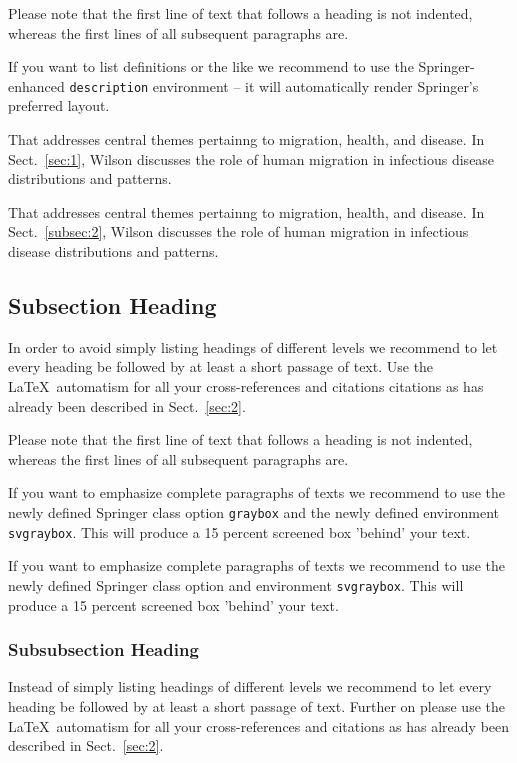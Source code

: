 \documentclass[graybox]{svmult}
\begin{document}
Please note that the first line of text that follows a heading is not indented, whereas the first lines of all subsequent paragraphs are.

If you want to list definitions or the like we recommend to use the Springer-enhanced \verb|description| environment -- it will automatically render Springer's preferred layout.

\begin{description}[Type 1]
\item[Type 1]{That addresses central themes pertainng to migration, health, and disease. In Sect.~\ref{sec:1}, Wilson discusses the role of human migration in infectious disease distributions and patterns.}
\item[Type 2]{That addresses central themes pertainng to migration, health, and disease. In Sect.~\ref{subsec:2}, Wilson discusses the role of human migration in infectious disease distributions and patterns.}
\end{description}

\subsection{Subsection Heading} %
In order to avoid simply listing headings of different levels we recommend to let every heading be followed by at least a short passage of text. Use the \LaTeX\ automatism for all your cross-references and citations citations as has already been described in Sect.~\ref{sec:2}.

Please note that the first line of text that follows a heading is not indented, whereas the first lines of all subsequent paragraphs are.

\begin{svgraybox}
If you want to emphasize complete paragraphs of texts we recommend to use the newly defined Springer class option \verb|graybox| and the newly defined environment \verb|svgraybox|. This will produce a 15 percent screened box 'behind' your text.

If you want to emphasize complete paragraphs of texts we recommend to use the newly defined Springer class option and environment \verb|svgraybox|. This will produce a 15 percent screened box 'behind' your text.
\end{svgraybox}


\subsubsection{Subsubsection Heading}
Instead of simply listing headings of different levels we recommend to
let every heading be followed by at least a short passage of text.
Further on please use the \LaTeX\ automatism for all your
cross-references and citations as has already been described in
Sect.~\ref{sec:2}.
\end{document}
